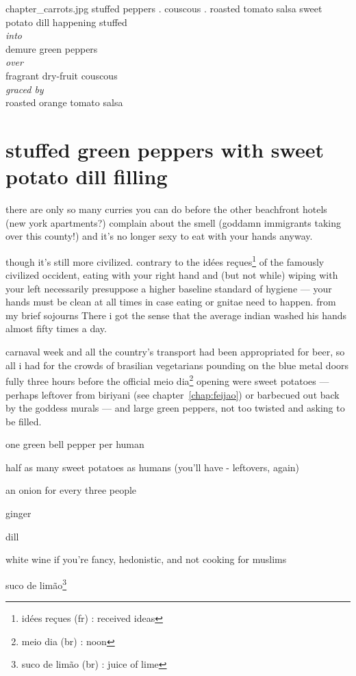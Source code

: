 \mychapter
{chapter_carrots.jpg}
{stuffed peppers . couscous . roasted tomato salsa}
{sweet potato dill happening stuffed\\
\textit{into}\\
demure green peppers\\
\textit{over}\\
fragrant dry-fruit couscous\\
\textit{graced by}\\
roasted orange tomato salsa}

\section{stuffed green peppers with sweet potato dill filling}

there are only so many curries you can do before the other beachfront hotels 
(new york apartments?) complain about the smell (goddamn immigrants taking 
over this county!) and it's no longer sexy to eat with your hands anyway.

though it's still more civilized. contrary to the id\'{e}es 
re\c{c}ues\footnote{id\'{e}es re\c{c}ues (fr) : received ideas} of 
the famously civilized occident, eating with your right hand and (but not 
while) wiping with your left necessarily presuppose a higher baseline 
standard of hygiene --- your hands must be clean at all times in case eating 
or gnitae need to happen. from my brief sojourns There i got the sense that 
the average indian washed his hands almost fifty times a day.

carnaval week and all the country's transport had been appropriated for beer, 
so all i had for the crowds of brasilian vegetarians pounding on the blue 
metal doors fully three hours before the official meio dia\footnote{meio dia 
(br) : noon} opening were sweet potatoes --- perhaps leftover from biriyani 
(see chapter~\ref{chap:feijao}) or barbecued out back by the 
goddess murals --- and large green peppers, not too twisted and asking to be 
filled.

\begin{ingredients}
  \item one green bell pepper per human
  \item half as many sweet potatoes as humans (you'll have - leftovers, again)
  \item an onion for every three people
  \item ginger
  \item dill
  \item white wine if you're fancy, hedonistic, and not cooking for muslims
  \item suco de lim\~{a}o\footnote{suco de lim\~{a}o (br) : juice of lime}
\end{ingredients}

